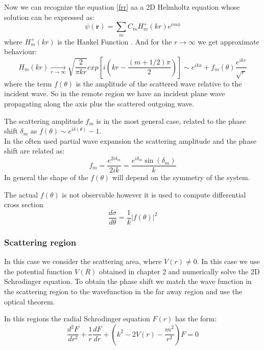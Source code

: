 Now we can recognize the equation \eqref{frr} aa a 2D Helmholtz equation whose solution can be expressed as:
\begin{equation}\label{2DS2H}
\psi(\mathbf{r}) = \sum_{m}{C_mH_m^+(kr)e^{im\phi}}
\end{equation}
where $ H_m^+(kr) $ is the Hankel Function .
And for the $ r \rightarrow \infty $ we get approximate behaviour:
\begin{equation}\label{2DS2}
    H_m(kr) \xrightarrow[r \rightarrow \infty]{}\sqrt{\frac{2}{\pi k r}}exp\left[i\left(kr - \frac{(m + 1/2)\pi}{2}\right)\right] \sim e^{ikx} + f_m(\theta) \frac{e^{ikr}}{\sqrt{r}}
\end{equation}
where the term $ f(\theta) $ is the amplitude of the scattered wave relative to the incident wave. 
So in the remote region we have an incident plane wave propagating along the axis plus the scattered outgoing wave.

The scattering amplitude $ f_m $ is in the most general case, related to the phase shift $ \delta_m $ as $ f(\theta) \sim e^{i\delta(\theta)} - 1 $. \\
In the often used partial wave expansion the scattering amplitude and the phase shift are related as:
\begin{equation}
    f_m = \frac{e^{2i \delta_m}}{2ik} = \frac{e^{i\delta_m}\sin(\delta_m)}{k}
\end{equation}
In general the shape of the $ f(\theta) $ will depend on the symmetry of the system.

The actual $ f(\theta) $ is not observable however it is used to compute differential cross section
\begin{equation}
    \frac{d\sigma}{d\theta} = \frac{1}{k}\left|f(\theta)\right|^2
\end{equation}

\subsubsection{\textbf{Scattering region}}

In this case we consider the scattering area, where $ V(r) \neq 0 $. In this case we use the potential function $ V(R) $ obtained in chapter 2 and numerically solve the 2D Schrodinger equation. To obtain the phase shift we match the wave function in the scattering region to the wavefunction in the far away region and use the optical theorem.

In this regions the radial Schrodinger equation $ F(r) $ has the form:
\begin{equation}\label{frrSr}
\frac{d^2 F}{dr^2} + \frac{1}{r}\frac{dF}{dr} + \left(k^2 - 2V(r) - \frac{m^2}{r^2}\right)F = 0
\end{equation}



